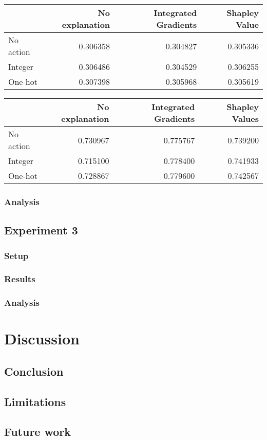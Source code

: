\documentclass[UKenglish]{uiomasterthesis}
\begin{document}
\begin{center}
\label{tab:state_simpl_lstm}
\begin{tabular}{lrrr}
\toprule
 & No explanation & Integrated Gradients & Shapley Value \\
\midrule
No action & 0.306358 & 0.304827 & 0.305336 \\
Integer & 0.306486 & 0.304529 & 0.306255 \\
One-hot & 0.307398 & 0.305968 & 0.305619 \\
\bottomrule
\end{tabular}
\end{center}

\begin{center}
\label{tab:event_simpl_lstm}
\begin{tabular}{lrrr}
\toprule
 & No explanation & Integrated Gradients & Shapley Values \\
\midrule
No action & 0.730967 & 0.775767 & 0.739200 \\
Integer & 0.715100 & 0.778400 & 0.741933 \\
One-hot & 0.728867 & 0.779600 & 0.742567 \\
\bottomrule
\end{tabular}
\end{center}

\subsection{Analysis}

\section{Experiment 3}
\subsection{Setup}
\subsection{Results}
\subsection{Analysis}

\chapter{Discussion}

\section{Conclusion}

\section{Limitations}

\section{Future work}


\printbibliography{}
\end{document}
